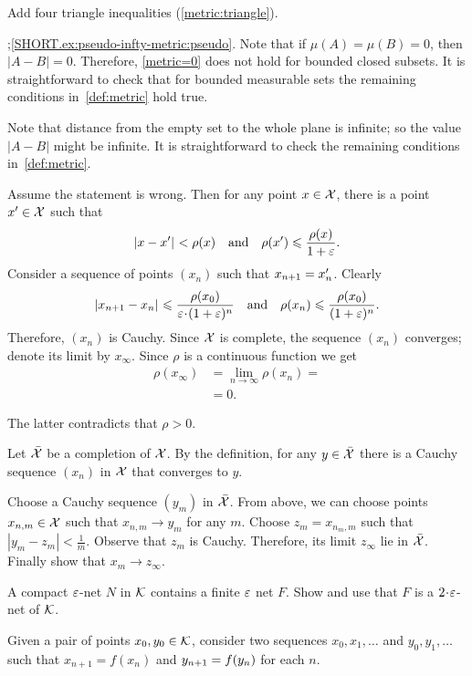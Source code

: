 Add four triangle inequalities (\ref{metric:triangle}).

\parbf{\ref{ex:pseudo-infty-metric}};\ref{SHORT.ex:pseudo-infty-metric:pseudo}.
Note that if $\mu(A)=\mu(B)=0$, then $|A-B|=0$.
Therefore, \ref{metric=0} does not hold for bounded closed subsets.
It is straightforward to check that for bounded measurable sets the remaining conditions in~\ref{def:metric} hold true.

Note that distance from the empty set to the whole plane is infinite; so the value $|A-B|$ might be infinite.
It is straightforward to check the remaining conditions in~\ref{def:metric}.


Assume the statement is wrong. 
Then for any point $x\in \mathcal{X}$, there is a point $x'\in \mathcal{X}$ such that 
\[\dist{x}{x'}{}< \rho(x)
\quad\text{and}\quad
\rho(x')\le\frac{\rho(x)}{1+\eps}.\]
Consider a sequence of points $(x_n)$ such that $x_{n+1}\z=x_n'$.
Clearly 
\[\dist{x_{n+1}}{x_n}{}
\le
\frac{\rho(x_0)}{\eps\cdot(1+\eps)^n}
\quad\hbox{and}\quad
\rho(x_n)\le \frac{\rho(x_0)}{(1+\eps)^n}.\] 
Therefore, $(x_n)$ is Cauchy.
Since $\mathcal{X}$ is complete, the sequence $(x_n)$ converges;
denote its limit by $x_\infty$.
Since $\rho$ is a continuous function we get
\begin{align*}\rho(x_\infty)&=\lim_{n\to\infty}\rho(x_n)=
\\&=0.
\end{align*}

The latter contradicts that $\rho>0$.

Let $\bar {\mathcal{X}}$ be a completion of $\mathcal{X}$.
By the definition, for any $y\in \bar {\mathcal{X}}$ there is a Cauchy sequence $(x_n)$ in  $\mathcal{X}$ that converges to $y$.

Choose a Cauchy sequence $(y_m)$ in $\bar {\mathcal{X}}$.
From above, we can choose points $x_{n,m}\in \mathcal{X}$ such that $x_{n,m}\to y_m$ for any $m$.
Choose $z_m=x_{n_m,m}$ such that $|y_m-z_m|<\tfrac1m$.
Observe that $z_m$ is Cauchy.
Therefore, its limit $z_\infty$ lie in $\bar{\mathcal{X}}$.
Finally show that $x_m\to z_\infty$.

A compact $\varepsilon$-net $N$ in $\mathcal{K}$ contains a finite $\varepsilon$ net $F$.
Show and use that $F$ is a $2\cdot\eps$-net of $\mathcal{K}$.

Given a pair of points $x_0,y_0\in \mathcal{K}$, 
consider two sequences $x_0,x_1,\dots$ and $y_0,y_1,\dots$
such that $x_{n+1}=f(x_n)$ and $y_{n+1}\z=f(y_n)$ for each $n$.

